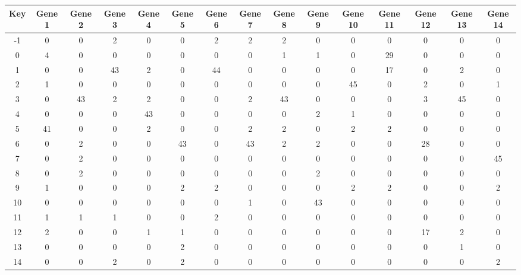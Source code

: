 \begin{tabular}{|c|c|c|c|c|c|c|c|c|c|c|c|c|c|c|}
\hline
Key & Gene 1 & Gene 2 & Gene 3 & Gene 4 & Gene 5 & Gene 6 & Gene 7 & Gene 8 & Gene 9 & Gene 10 & Gene 11 & Gene 12 & Gene 13 & Gene 14 \\
\hline
-1 & 0 & 0 & 2 & 0 & 0 & 2 & 2 & 2 & 0 & 0 & 0 & 0 & 0 & 0 \\
0 & 4 & 0 & 0 & 0 & 0 & 0 & 0 & 1 & 1 & 0 & 29 & 0 & 0 & 0 \\
1 & 0 & 0 & 43 & 2 & 0 & 44 & 0 & 0 & 0 & 0 & 17 & 0 & 2 & 0 \\
2 & 1 & 0 & 0 & 0 & 0 & 0 & 0 & 0 & 0 & 45 & 0 & 2 & 0 & 1 \\
3 & 0 & 43 & 2 & 2 & 0 & 0 & 2 & 43 & 0 & 0 & 0 & 3 & 45 & 0 \\
4 & 0 & 0 & 0 & 43 & 0 & 0 & 0 & 0 & 2 & 1 & 0 & 0 & 0 & 0 \\
5 & 41 & 0 & 0 & 2 & 0 & 0 & 2 & 2 & 0 & 2 & 2 & 0 & 0 & 0 \\
6 & 0 & 2 & 0 & 0 & 43 & 0 & 43 & 2 & 2 & 0 & 0 & 28 & 0 & 0 \\
7 & 0 & 2 & 0 & 0 & 0 & 0 & 0 & 0 & 0 & 0 & 0 & 0 & 0 & 45 \\
8 & 0 & 2 & 0 & 0 & 0 & 0 & 0 & 0 & 2 & 0 & 0 & 0 & 0 & 0 \\
9 & 1 & 0 & 0 & 0 & 2 & 2 & 0 & 0 & 0 & 2 & 2 & 0 & 0 & 2 \\
10 & 0 & 0 & 0 & 0 & 0 & 0 & 1 & 0 & 43 & 0 & 0 & 0 & 0 & 0 \\
11 & 1 & 1 & 1 & 0 & 0 & 2 & 0 & 0 & 0 & 0 & 0 & 0 & 0 & 0 \\
12 & 2 & 0 & 0 & 1 & 1 & 0 & 0 & 0 & 0 & 0 & 0 & 17 & 2 & 0 \\
13 & 0 & 0 & 0 & 0 & 2 & 0 & 0 & 0 & 0 & 0 & 0 & 0 & 1 & 0 \\
14 & 0 & 0 & 2 & 0 & 2 & 0 & 0 & 0 & 0 & 0 & 0 & 0 & 0 & 2 \\
\hline
\end{tabular}